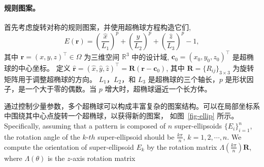 \paragraph{规则图案。}首先考虑旋转对称的规则图案，并使用超椭球方程构造它们,
\begin{equation}
    \label{eq-ellipsoid}
    E(\mathbf{r})=\left(\frac{\hat{x}}{L_1}\right)^p+\left(\frac{\hat{y}}{L_2}\right)^p+\left(\frac{\hat{z}}{L_3}\right)^p-1,
\end{equation}
其中 $\mathbf{r}=(x, y, z)^\top\in\Omega$ 为三维空间 $\mathbb{R}^3$ 中的设计域,  $\mathbf{c}_0=(x_0,y_0,z_0)^\top$ 是超椭球的中心坐标。
定义 $\hat{\mathbf{r}}=(\hat{x}, \hat{y}, \hat{z})^\top=\mathbf{R}(\mathbf{r}-\mathbf{c}_0)$, 其中 $\mathbf{R}=\{R_{ij}\}_{3\times 3}$ 为旋转矩阵用于调整超椭球的方向。 $L_1$，$L_2$，和 $L_3$ 是超椭球的三个轴长，$p$ 是形状因子，是一个大于零的偶数。当 $p$ 增大时，超椭球逼近一个长方体。

通过控制少量参数，多个超椭球可以构成丰富复杂的图案结构。可以在局部坐标系中围绕其中心点旋转一个超椭球，以获得新的图案， 如图~\ref{fig-ellip} 所示。Specifically, assuming that a pattern is composed of $n$ super-ellipsoids $\{E_i\}_{i=1}^n$, the rotation angle of the $k$-$th$ super-ellipsoid should be $\frac{k\pi}{n}$, $k=1,2,\cdots,n$. 
We compute the orientation of super-ellipsoid $E_k$ by the rotation matrix $\Lambda(\frac{k\pi}{n})\mathbf{R}$, where $\Lambda(\theta)$ is the $z$-axis rotation matrix 